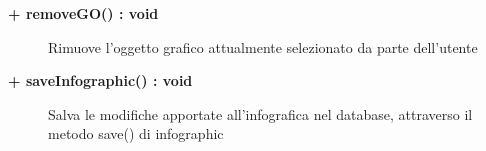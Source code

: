 \begin{description}
	\begin{description}
		\item[\textbf{\color{blue}+ removeGO() : void 	}] \hfill
			Rimuove l'oggetto grafico attualmente selezionato da parte dell'utente
	
	\end{description}
	
	\begin{description}
		\item[\textbf{\color{blue}+ saveInfographic() : void 	}] \hfill
			Salva le modifiche apportate all'infografica nel database, attraverso il metodo save() di infographic
	
	\end{description}
	

\end{description}
